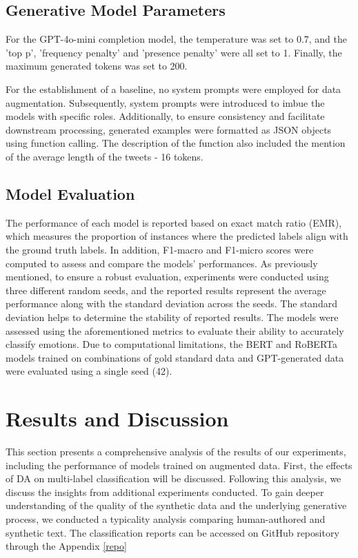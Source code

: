 \documentclass[manuscript]{clv3}
\begin{document}
\subsection{Generative Model Parameters}
For the GPT-4o-mini completion model, the temperature was set to 0.7, and the 'top p', 'frequency penalty' and 'presence penalty' were all set to 1. Finally, the maximum generated tokens was set to 200.

For the establishment of a baseline, no system prompts were employed for data augmentation. Subsequently, system prompts were introduced to imbue the models with specific roles. Additionally, to ensure consistency and facilitate downstream processing, generated examples were formatted as JSON objects using function calling. The description of the function also included the mention of the average length of the tweets - 16 tokens.
\subsection{Model Evaluation}
The performance of each model is reported based on exact match ratio (EMR), which measures the proportion of instances where the predicted labels align with the ground truth labels. In addition, F1-macro and F1-micro scores were computed to assess and compare the models' performances. As previously mentioned, to ensure a robust evaluation, experiments were conducted using three different random seeds, and the reported results represent the average performance along with the standard deviation across the seeds. The standard deviation helps to determine the stability of reported results. The models were assessed using the aforementioned metrics to evaluate their ability to accurately classify emotions. Due to computational limitations, the BERT and RoBERTa models trained on combinations of gold standard data and GPT-generated data were evaluated using a single seed (42). 

\section{Results and Discussion}
This section presents a comprehensive analysis of the results of our experiments, including the performance of models trained on augmented data. First, the effects of DA on multi-label classification will be discussed. Following this analysis, we discuss the insights from additional experiments conducted. To gain deeper understanding of the quality of the synthetic data and the underlying generative process, we conducted a typicality analysis comparing human-authored and synthetic text. The classification reports can be accessed on GitHub repository through the Appendix \autoref{repo}
\end{document}
